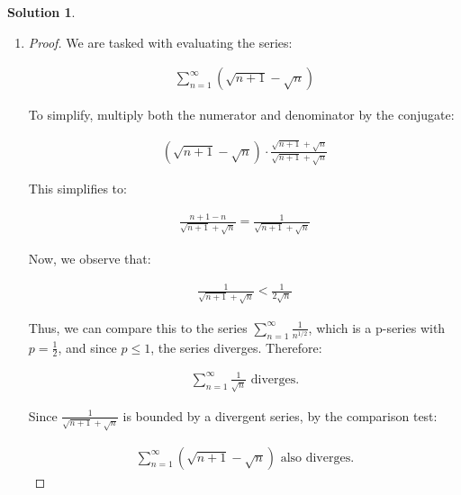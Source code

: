 \documentclass[12pt]{article}
\theoremstyle{definition} %
\newtheorem{solution}{Solution}
\theoremstyle{plain} %
\begin{document}
\begin{solution}
\begin{enumerate}
\begin{proof}
      Since the limit results in a constant value, we conclude:
      

         \end{proof}
      
      \item \begin{proof}
         We are tasked with evaluating the series:
      
      \begin{align}
      \sum_{n=1}^{\infty} \left( \sqrt{n+1} - \sqrt{n} \right)
      \end{align}
      
      To simplify, multiply both the numerator and denominator by the conjugate:
      
      \begin{align}
      \left( \sqrt{n+1} - \sqrt{n} \right) \cdot \frac{\sqrt{n+1} + \sqrt{n}}{\sqrt{n+1} + \sqrt{n}}
      \end{align}
      
      This simplifies to:
      
      \begin{align}
      \frac{n+1 - n}{\sqrt{n+1} + \sqrt{n}} = \frac{1}{\sqrt{n+1} + \sqrt{n}}
      \end{align}
      
      Now, we observe that:
      
      \begin{align}
      \frac{1}{\sqrt{n+1} + \sqrt{n}} < \frac{1}{2\sqrt{n}}
      \end{align}
      
      Thus, we can compare this to the series $ \sum_{n=1}^{\infty} \frac{1}{n^{1/2}} $, which is a p-series with $ p = \frac{1}{2} $, and since $ p \leq 1 $, the series diverges. Therefore:
      
      \begin{align}
      \sum_{n=1}^{\infty} \frac{1}{\sqrt{n}} \text{ diverges.}
      \end{align}
      
      Since $ \frac{1}{\sqrt{n+1} + \sqrt{n}} $ is bounded by a divergent series, by the comparison test:
      
      \begin{align}
      \sum_{n=1}^{\infty} \left( \sqrt{n+1} - \sqrt{n} \right) \text{ also diverges.}
      \end{align}
      \end{proof}
       
      \end{enumerate}
      \end{solution}
\end{document}
